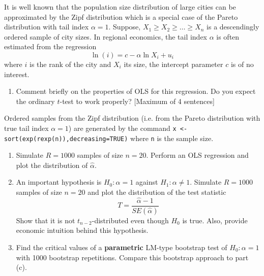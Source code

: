 \documentclass{article}
\begin{document}
It is well known that the population size distribution of large cities can
be approximated by the Zipf distribution which is a special case of the
Pareto distribution with tail index $\alpha =1$. Suppose, $X_{1}\geq
X_{2}\geq \ldots \geq X_{n}$ is a descendingly ordered sample of city sizes.
In regional economics, the tail index $\alpha $ is often estimated from the
regression%
\begin{equation*}
\ln \left( i\right) =c-\alpha \ln X_{i}+u_{i}
\end{equation*}%
where $i$ is the rank of the city and $X_{i}$ its size, the intercept
parameter $c$ is of no interest.
\begin{enumerate}[label=(\alph*)]
  \item Comment briefly on the properties of OLS for this regression. Do you expect the ordinary $t$-test to work properly? [Maximum of 4 sentences]
\end{enumerate}
Ordered samples from the Zipf distribution (i.e. from the Pareto distribution with true tail
index $\alpha =1$) are generated by the command \texttt{x <- sort(exp(rexp(n)),decreasing=TRUE)} where \texttt{n} is the sample size.
\begin{enumerate}[label=(\alph*),resume]
\item Simulate $R=1000$ samples of size $n=20$. Perform an OLS regression and plot the distribution of $\hat{\alpha}$.
\item An important hypothesis is $H_{0}:\alpha =1$ against $H_{1}:\alpha
\neq 1$. Simulate $R=1000$ samples of size $n=20$ and plot the distribution of the test statistic
\begin{equation*}
T=\frac{\hat{\alpha}-1}{SE(\hat{\alpha})}
\end{equation*}
Show that it is not $t_{n-2}$-distributed even though $H_{0}$ is true. Also, provide economic intuition behind this hypothesis.

\item Find the critical values of a \textbf{parametric} LM-type bootstrap test of $H_{0}:\alpha =1$ with 1000 bootstrap repetitions. Compare this bootstrap approach to part (c).
\end{enumerate}

\newpage
\end{document}
